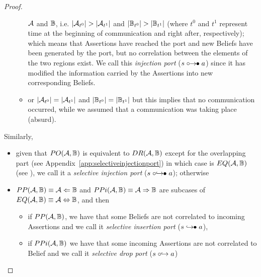 \begin{proof}
\begin{itemize}
\begin{itemize}
					$\mathcal{A}$ and $\mathbb{B}$, i.e.
					$|\assertionRegion_{t^0}|>|\assertionRegion_{t^1}|$ and
					$|\beliefRegion_{t^0}|>|\beliefRegion_{t^1}|$ (where
					$t^0$ and $t^1$ represent time at the beginning of
					communication and right after, respectively); which
					means that Assertions have reached the port and new
					Beliefs have been generated by the port, but no
					correlation between the elements of the two regions exist. 
					We call this \emph{injection port} ($s\mathrel{\circ\!\!\rightarrow\!\!\bullet} a$) since it has modified
					the information carried by the Assertions into new
					corresponding Beliefs.
				\item or $|\mathcal{A}_{t^0}|=|\mathcal{A}_{t^1}|$
					and $|\mathbb{B}_{t^0}|=|\mathbb{B}_{t^1}|$ but
					this implies that no communication occurred, while we
					assumed that a communication was taking place (absurd).
			\end{itemize}
	\end{itemize}
	Similarly, 
	\begin{itemize}
		\item given that $PO(\mathcal{A},\mathbb{B})$ is equivalent to
			$DR(\mathcal{A},\mathbb{B})$ except for the
			overlapping part (see Appendix~\ref{app:selectiveinjectionport}) in which case is
			$EQ(\mathcal{A},\mathbb{B})$ (see
			\autocite{Santaca2016abf}),
			we call it a \emph{selective injection port} ($s\mathrel{\circ\!\!\hookrightarrow\!\!\bullet} a$); otherwise
		\item $PP(\mathcal{A},\mathbb{B})\equiv\mathcal{A}\Leftarrow\mathbb{B}$ and
			$PPi(\mathcal{A},\mathbb{B})\equiv\mathcal{A}\Rightarrow\mathbb{B}$ are subcases of
			$EQ(\mathcal{A},\mathbb{B})\equiv\mathcal{A}\Leftrightarrow\mathbb{B}$, and then
		\begin{itemize}
			\item if $PP(\mathcal{A},\mathbb{B})$, we have that
				some Beliefs are not correlated to incoming Assertions
				and we call it \emph{selective insertion port} ($s\mathrel{\hookrightarrow\!\!\bullet} a$),
			\item if $PPi(\mathcal{A},\mathbb{B})$ we have that
				some incoming Assertions are not correlated to Belief 
				and we call it \emph{selective drop port} ($s\mathrel{\circ\!\!\hookrightarrow} a$)
		\end{itemize}
	\end{itemize}
\end{proof}

